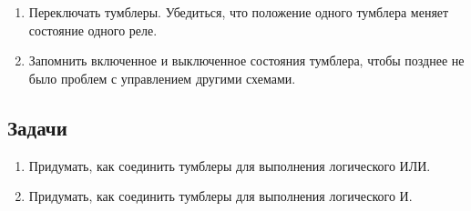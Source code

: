 \begin{enumerate}
    \item Переключать тумблеры. Убедиться, что положение одного тумблера меняет состояние одного реле.
    \item Запомнить включенное и выключенное состояния тумблера, чтобы позднее не было проблем с управлением другими схемами.
\end{enumerate}

\subsection{Задачи}

\begin{enumerate}
    \item Придумать, как соединить тумблеры для выполнения логического ИЛИ.
    \item Придумать, как соединить тумблеры для выполнения логического И.
\end{enumerate}

